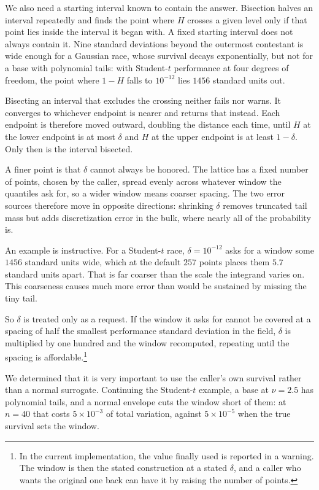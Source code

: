 \documentclass[11pt]{article}
\begin{document}
We also need a starting interval known to contain the answer. Bisection
halves an interval repeatedly and finds the point where $H$ crosses a
given level only if that point lies inside the interval it began with. A
fixed starting interval does not always contain it. Nine standard
deviations beyond the outermost contestant is wide enough for a Gaussian
race, whose survival decays exponentially, but not for a base with
polynomial tails: with Student-$t$ performance at four degrees of
freedom, the point where $1-H$ falls to $10^{-12}$ lies $1456$ standard
units out.

Bisecting an interval that excludes the crossing neither fails nor warns.
It converges to whichever endpoint is nearer and returns that instead.
Each endpoint is therefore moved outward, doubling the distance each
time, until $H$ at the lower endpoint is at most $\delta$ and $H$ at the
upper endpoint is at least $1-\delta$. Only then is the interval
bisected.

A finer point is that $\delta$ cannot always be honored. The
lattice has a fixed number of points, chosen by the caller, spread evenly
across whatever window the quantiles ask for, so a wider window means
coarser spacing. The two error sources therefore move in opposite
directions: shrinking $\delta$ removes truncated tail mass but adds
discretization error in the bulk, where nearly all of the probability is.

An example is instructive. For a Student-$t$ race, $\delta=10^{-12}$ asks for a window some
$1456$ standard units wide, which at the default $257$ points places them
$5.7$ standard units apart. That is far coarser than the scale the
integrand varies on. This coarseness causes much more error than would be sustained by missing the tiny tail.

So $\delta$ is treated only as a request. If the window it asks for cannot be
covered at a spacing of half the smallest performance standard deviation
in the field, $\delta$ is multiplied by one hundred and the window
recomputed, repeating until the spacing is affordable.\footnote{In the
current implementation, the value finally used is reported in a warning.
The window is then the stated construction at a stated $\delta$, and a
caller who wants the original one back can have it by raising the number
of points.}

We determined that it is very important to use the caller's own
survival rather than a normal surrogate. Continuing the Student-$t$
example, a base at $\nu=2.5$ has polynomial tails, and a normal envelope
cuts the window short of them: at $n=40$ that costs
$5\times10^{-3}$ of total variation, against $5\times10^{-5}$ when the
true survival sets the window.
\end{document}
